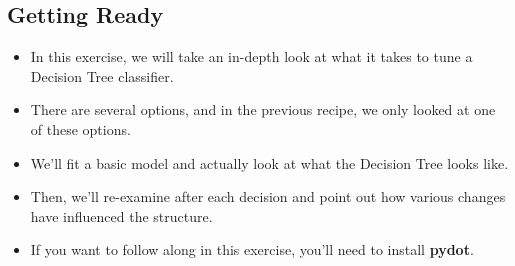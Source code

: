 \documentclass[SKL-MASTER.tex]{subfiles}
\begin{document}
\subsection*{Getting Ready}
\begin{itemize}
\item In this exercise, we will take an in-depth look at what it takes to tune a Decision Tree classifier.
\item There are several options, and in the previous recipe, we only looked at one of these options.
\item We'll fit a basic model and actually look at what the Decision Tree looks like. 
\item Then,
we'll re-examine after each decision and point out how various changes have influenced
the structure.
\item If you want to follow along in this exercise, you'll need to install \textbf{pydot}.
\end{itemize}
\end{document}
